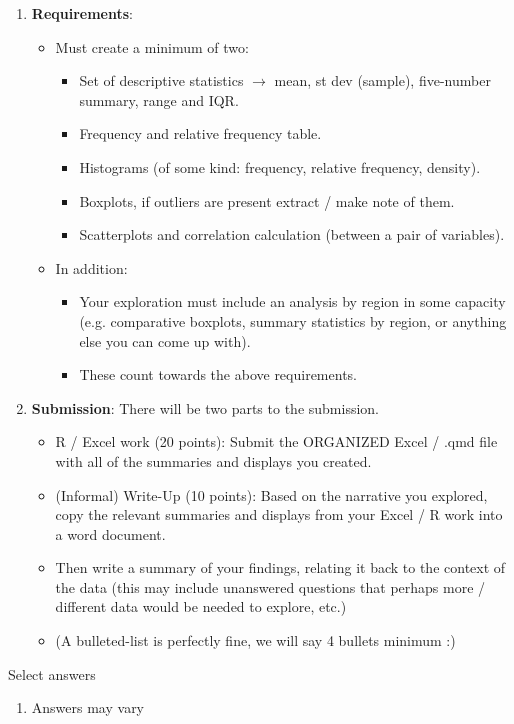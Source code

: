 \documentclass{article}
\begin{document}
\begin{enumerate}
    \item[] \textbf{Requirements}:
    \begin{itemize}
        \item Must create a minimum of two:
        \begin{itemize}
            \item Set of descriptive statistics $\rightarrow$ mean, st dev (sample), five-number summary, range and IQR.
        \item Frequency and relative frequency table.
        \item Histograms (of some kind: frequency, relative frequency, density).
        \item Boxplots, if outliers are present extract / make note of them.
        \item Scatterplots and correlation calculation (between a pair of variables).
        \end{itemize}
        \item In addition:
        \begin{itemize}
            \item Your exploration must include an analysis by region in some capacity (e.g. comparative boxplots, summary statistics by region, or anything else you can come up with).
            \item These count towards the above requirements.
        \end{itemize}
    \end{itemize}\bigskip
    
    \item[] \textbf{Submission}: There will be two parts to the submission.
     \begin{itemize}
        \item R / Excel work (20 points): Submit the ORGANIZED Excel / .qmd file with all of the summaries and displays you created.
        \item (Informal) Write-Up (10 points): Based on the narrative you explored, copy the relevant summaries and displays from your Excel / R work into a word document. 
        \item[] Then write a summary of your findings, relating it back to the context of the data (this may include unanswered questions that perhaps more / different data would be needed to explore, etc.)
        \item[] (A bulleted-list is perfectly fine, we will say 4 bullets minimum :)
     \end{itemize}
     
\end{enumerate}\bigskip\bigskip

Select answers\bigskip
\begin{enumerate}
    \item Answers may vary                
\end{enumerate}
\end{document}
